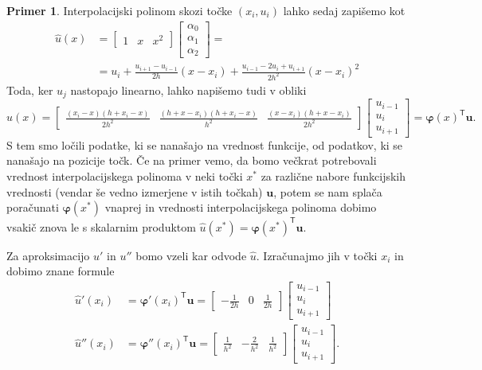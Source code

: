 \documentclass[12pt,a4paper]{article}
\theoremstyle{definition} %
\newtheorem{primer}[definicija]{Primer}
\theoremstyle{plain} %
\numberwithin{equation}{section}
\newcommand{\T}{\mathsf{T}}
\renewcommand{\b}{\boldsymbol}
\renewcommand{\phi}{\varphi}
\begin{document}
\begin{primer}
Interpolacijski polinom skozi točke $(x_i, u_i)$ lahko sedaj zapišemo kot
\begin{align*}
  \hat{u}(x) &=
  \begin{bmatrix}
    1 & x & x^2
  \end{bmatrix}
  \begin{bmatrix}
    \alpha_0 \\ \alpha_1 \\ \alpha_2
  \end{bmatrix} = \\
  &= u_i +\frac{u_{i+1}-u_{i-1}}{2 h}(x-x_i)+\frac{u_{i-1}-2 u_{i}+u_{i+1}}{2 h^2}(x-x_i)^2
\end{align*}
Toda, ker $u_j$ nastopajo linearno, lahko napišemo tudi v obliki
\[
  \hat{u}(x) =
  \begin{bmatrix}
  \frac{(x_i-x) (h+x_i-x)}{2 h^2} & \frac{(h+x-x_i)(h+x_i-x)}{h^2} & \frac{(x-x_i) (h+x-x_i)}{2 h^2}
  \end{bmatrix}
  \begin{bmatrix}
    u_{i-1} \\ u_{i} \\ u_{i+1}
  \end{bmatrix}= \b\phi(x)^\T\b u.
\]
S tem smo ločili podatke, ki se nanašajo na vrednost funkcije, od podatkov, ki
se nanašajo na pozicije točk. Če na primer vemo, da bomo večkrat potrebovali
vrednost interpolacijskega polinoma v neki točki $x^\ast$ za različne nabore
funkcijskih vrednosti (vendar še vedno izmerjene v istih točkah) $\b u$, potem
se nam splača poračunati $\b\phi(x^\ast)$ vnaprej in vrednosti
interpolacijskega polinoma dobimo vsakič znova le s skalarnim produktom $\hat
u(x^\ast) = \b\phi(x^\ast) ^\T \b u$.

Za aproksimacijo $u'$ in $u''$ bomo vzeli kar odvode $\hat{u}$. Izračunajmo
jih v točki $x_i$ in dobimo znane formule
\begin{align*}
  \hat u'(x_i) &= \b\phi'(x_i)^\T \b u =
  \begin{bmatrix}
    -\frac{1}{2h} & 0 & \frac{1}{2h}
  \end{bmatrix} \begin{bmatrix}
    u_{i-1} \\ u_{i} \\ u_{i+1}
  \end{bmatrix}\\
  \hat u''(x_i) &= \b\phi''(x_i)^\T \b u =
  \begin{bmatrix}
    \frac{1}{h^2} & -\frac{2}{h^2} & \frac{1}{h^2}
  \end{bmatrix}\begin{bmatrix}
    u_{i-1} \\ u_{i} \\ u_{i+1}
  \end{bmatrix}.
\end{align*}


\end{primer}
\end{document}
